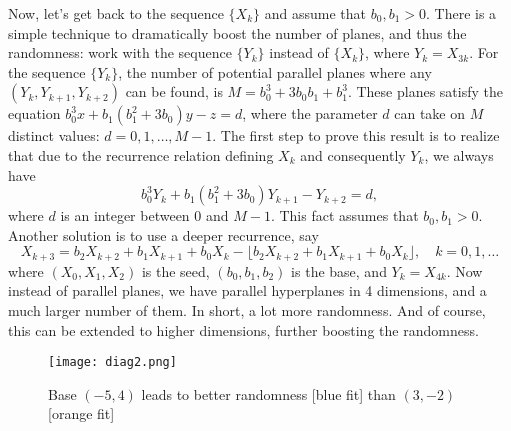 \documentclass[oneside,10pt]{book}
\begin{document}
Now, let's get back to the sequence $\{X_k\}$ and assume that $b_0, b_1>0$. There is a simple technique to dramatically boost the number of planes, and thus the randomness: work with the sequence $\{Y_k\}$ instead of $\{X_k\}$, where
 $Y_k = X_{3k}$. For the sequence $\{Y_{k}\}$, the number of potential parallel planes where any $(Y_k,Y_{k+1},Y_{k+2})$ can be found, is $M = b_0^3 + 3b_0 b_1 + b_1^3$. These planes satisfy the equation
 $b_0^3 x +b_1(b_1^2 +3b_0) y - z =d$, where the parameter $d$ can take on $M$ distinct values: $d = 0, 1,\dots,M-1$.  The first step to prove this result is to realize that due to the recurrence relation defining $X_k$ and consequently $Y_k$, we always have
$$
b_0^3 Y_k +b_1(b_1^2 +3b_0) Y_{k+1} - Y_{k+2} =d,
$$ 
where $d$ is an integer between $0$ and $M-1$. This fact assumes that $b_0, b_1 > 0$. Another solution is to use a deeper recurrence,
 say 
$$
X_{k+3} = b_2 X_{k+2} + b_1 X_{k+1} + b_0 X_k - \lfloor b_2 X_{k+2} + b_1 X_{k+1} + b_0 X_k \rfloor, \quad k=0,1,\dots
$$
 where $(X_0, X_1, X_2)$ is the seed, $(b_0, b_1, b_2)$ is the base, and $Y_k=X_{4k}$. Now instead of parallel planes, we have 
 parallel hyperplanes in 4 dimensions, and a much larger number of them. In short, a lot more randomness. And of course, this can be extended to higher dimensions, further boosting the randomness.

\begin{figure}%
\centering
\texttt{[image: diag2.png]}  
\caption{Base $(-5,4)$ leads to better randomness [blue fit] than $(3,-2)$ [orange fit]}
\label{fig:diag}
\end{figure}
\end{document}
